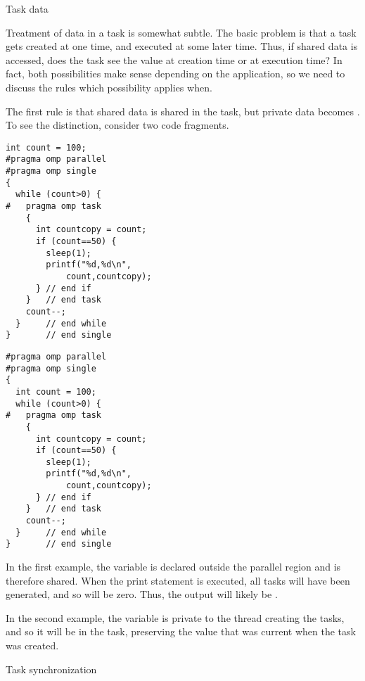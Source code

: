 {Task data}

Treatment of data in a task is somewhat subtle. The basic problem is
that a task gets created at one time, and executed at some later time.
Thus,
if shared data is accessed, does the task see the value at creation
time or at execution time? In fact, both possibilities make sense
depending on the application, so we need to discuss the rules 
which possibility applies when.

The first rule is that shared data is shared in the task, but private
data becomes . To see the distinction, consider two
code fragments.

\begin{multicols}{2}
\begin{lstlisting}
int count = 100;
#pragma omp parallel
#pragma omp single
{
  while (count>0) {
#   pragma omp task
    {
      int countcopy = count;
      if (count==50) {
        sleep(1);
        printf("%d,%d\n",
            count,countcopy);
      } // end if
    }   // end task
    count--;
  }     // end while
}       // end single
\end{lstlisting}

\columnbreak

\begin{lstlisting}
#pragma omp parallel
#pragma omp single
{
  int count = 100;
  while (count>0) {
#   pragma omp task
    {
      int countcopy = count;
      if (count==50) {
        sleep(1);
        printf("%d,%d\n",
            count,countcopy);
      } // end if
    }   // end task
    count--;
  }     // end while
}       // end single
\end{lstlisting}

\end{multicols}

In the first example,
the variable  is declared outside the
parallel region and is therefore shared. When the print statement is
executed, all tasks will have been generated, and so  will be
zero. Thus, the output will likely be .

In the second example,
the  variable is private to the thread creating the tasks,
and so it will be  in the task, preserving the value
that was current when the task was created.


 {Task synchronization}

